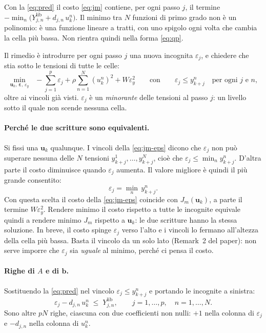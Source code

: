 \documentclass[11pt,a4paper]{article}
\newcommand{\vett}[1]{\boldsymbol{#1}}      %
\newcommand{\lib}{\mathrm{lib}}             %
\begin{document}
Con la \eqref{eq:pred} il costo \eqref{eq:jm} contiene, per ogni passo $j$, il
termine $-\min_n \bigl(Y^\lib_{j,n} + d_{j,n}\,u^n_k\bigr)$. Il minimo tra $N$
funzioni di primo grado non è un polinomio: è una funzione lineare a tratti,
con uno spigolo ogni volta che cambia la cella più bassa. Non rientra quindi
nella forma \eqref{eq:qp}.

Il rimedio è introdurre per ogni passo $j$ una nuova incognita
$\varepsilon_j$, e chiedere che stia sotto le tensioni di tutte le celle:
\begin{equation}
  \min_{\vett{u}_k,\,\vett{\varepsilon},\,\varepsilon_y} \;\;
     -\sum_{j=1}^{p} \varepsilon_j + \rho \sum_{n=1}^{N} (u^n_k)^2 + W \varepsilon_y^2
  \qquad \text{con} \qquad
  \varepsilon_j \le y^n_{k+j}
  \quad \text{per ogni } j \text{ e } n ,
  \label{eq:jm-eps}
\end{equation}
oltre ai vincoli già visti. $\varepsilon_j$ è un \emph{minorante} delle
tensioni al passo $j$: un livello sotto il quale non scende nessuna cella.

\paragraph{Perché le due scritture sono equivalenti.} Si fissi una $\vett{u}_k$
qualunque. I vincoli della \eqref{eq:jm-eps} dicono che $\varepsilon_j$ non
può superare nessuna delle $N$ tensioni
$y^1_{k+j}, \dots, y^N_{k+j}$, cioè che
$\varepsilon_j \le \min_n y^n_{k+j}$. D'altra parte il costo diminuisce
quando $\varepsilon_j$ aumenta. Il valore migliore è quindi il più grande
consentito:
\[
  \varepsilon_j = \min_{n}\, y^n_{k+j} .
\]
Con questa scelta il costo della \eqref{eq:jm-eps} coincide con $J_m(\vett{u}_k)$, a
parte il termine $W \varepsilon_y^2$. Rendere minimo il costo rispetto a tutte le
incognite equivale quindi a rendere minimo $J_m$ rispetto a $\vett{u}_k$: le due
scritture hanno la stessa soluzione. In breve, il costo spinge
$\varepsilon_j$ verso l'alto e i vincoli lo fermano all'altezza della cella
più bassa. Basta il vincolo da un solo lato (Remark~2 del paper): non serve
imporre che $\varepsilon_j$ sia \emph{uguale} al minimo, perché ci pensa il
costo.

\paragraph{Righe di $A$ e di $\vett{b}$.} Sostituendo la \eqref{eq:pred} nel vincolo
$\varepsilon_j \le y^n_{k+j}$ e portando le incognite a sinistra:
\begin{equation}
  \varepsilon_j - d_{j,n}\,u^n_k \;\le\; Y^\lib_{j,n} ,
  \qquad j = 1,\dots,p , \quad n = 1,\dots,N .
  \label{eq:riga-minorante}
\end{equation}
Sono altre $pN$ righe, ciascuna con due coefficienti non nulli: $+1$ nella
colonna di $\varepsilon_j$ e $-d_{j,n}$ nella colonna di $u^n_k$.
\end{document}
